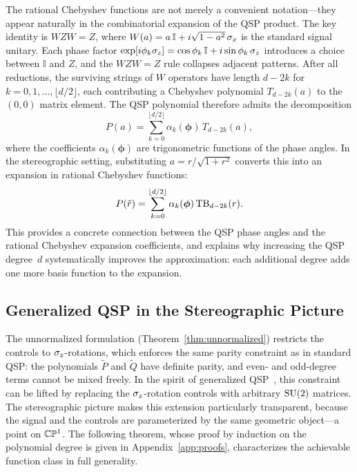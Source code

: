 The rational Chebyshev functions are not merely a convenient
notation---they appear naturally in the combinatorial expansion
of the QSP product.  The key identity is $WZW = Z$, where
$W(a) = a\,\mathbb{I} + i\sqrt{1-a^2}\,\sigma_x$ is the
standard signal unitary.  Each phase factor
$\exp[i\phi_k\sigma_z] = \cos\phi_k\,\mathbb{I} +
	i\sin\phi_k\,\sigma_z$ introduces a choice between
$\mathbb{I}$ and $Z$, and the $WZW = Z$ rule collapses
adjacent patterns.  After all reductions, the surviving strings
of $W$ operators have length $d - 2k$ for
$k = 0, 1, \ldots, \lfloor d/2 \rfloor$, each contributing a
Chebyshev polynomial $T_{d-2k}(a)$ to the $(0,0)$ matrix
element.  The QSP polynomial therefore admits the decomposition
\begin{equation}
	P(a) = \sum_{k=0}^{\lfloor d/2 \rfloor} \alpha_k(\bm{\phi})\, T_{d-2k}(a),
	\label{eq:chebyshev-decomposition}
\end{equation}
where the coefficients $\alpha_k(\bm{\phi})$ are trigonometric
functions of the phase angles.  In the stereographic setting,
substituting $a = r/\sqrt{1+r^2}$ converts this into an
expansion in rational Chebyshev functions:
\begin{equation}
	P(\tilde{r}) = \sum_{k=0}^{\lfloor d/2 \rfloor} \alpha_k(\bm{\phi})\, \mathrm{TB}_{d-2k}(r).
	\label{eq:rational-chebyshev-decomposition}
\end{equation}
This provides a concrete connection between the QSP phase
angles and the rational Chebyshev expansion coefficients, and
explains why increasing the QSP degree~$d$ systematically
improves the approximation: each additional degree adds one
more basis function to the expansion.

\subsection{Generalized QSP in the Stereographic Picture}
\label{subsec:generalized-qsp}

The unnormalized formulation
(Theorem~\ref{thm:unnormalized}) restricts the controls to
$\sigma_z$-rotations, which enforces the same parity constraint
as in standard QSP: the polynomials $\tilde{P}$ and
$\tilde{Q}$ have definite parity, and even- and odd-degree
terms cannot be mixed freely.  In the spirit of generalized
QSP~\cite{MotlaghWiebe2023}, this constraint can be lifted by
replacing the $\sigma_z$-rotation controls with arbitrary
$\mathrm{SU}(2)$ matrices.  The stereographic picture makes this
extension particularly transparent, because the signal and the
controls are parameterized by the same geometric object---a
point on $\mathbb{C}\mathbb{P}^1$.  The following theorem, whose proof
by induction on the polynomial degree is given in
Appendix~\ref{app:proofs}, characterizes the achievable
function class in full generality.


